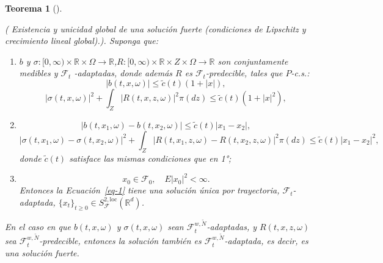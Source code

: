 \documentclass[
  spanish,
  us-letterpaper,
]{scrreprt}
\theoremstyle{plain}
\newtheorem{theorem}{Teorema}[chapter]
\theoremstyle{plain}
\theoremstyle{definition}
\theoremstyle{remark}
\begin{document}
\begin{theorem}[]\protect\hypertarget{thm-exis_uni_glo_fuerte_SDE}{}\label{thm-exis_uni_glo_fuerte_SDE}

( Existencia y unicidad global de una solución fuerte (condiciones de
Lipschitz y crecimiento lineal global).). Suponga que:

\begin{enumerate}
\def\labelenumi{\arabic{enumi}.}
\item
  \(b\) y
  \(\sigma : [0,\infty) \times \mathbb{R} \times \Omega \to \mathbb{R}\),\(R : [0,\infty) \times \mathbb{R}\times Z \times \Omega \to \mathbb{R}\)
  son conjuntamente medibles y \(\mathcal{F}_t\) -adaptadas, donde
  además \(R\) es \(\mathcal{F}_t\)-predecible, tales que \(P\)-c.s.:
  \[|b(t,x,\omega)| \leq \widetilde{c} (t)(1 + |x|),\]
  \[|\sigma(t,x,\omega)|^2 + \int_Z |R(t,x,z,\omega)|^2 \pi(dz) \leq \widetilde{c}(t)(1 + |x|^2),\]
\item
  \[|b(t,x_1,\omega) - b(t,x_2,\omega)| \leq \widetilde{c}(t) |x_1 - x_2|,\]
  \[|\sigma(t,x_1,\omega) - \sigma(t,x_2,\omega)|^2 + \int_Z |R(t,x_1,z,\omega) - R(t,x_2,z,\omega)|^2 \pi(dz) \leq \widetilde{c}(t) |x_1 - x_2|^2,\]
  donde \(\widetilde{c}(t)\) satisface las mismas condiciones que en 1°;
\item
  \[x_0 \in \mathcal{F}_0, \quad E|x_0|^2 < \infty.\] Entonces la
  Ecuación~\ref{eq-1} tiene una solución única por trayectoria,
  \(\mathcal{F}_t\)-adaptada,
  \(\{x_t\}_{t \geq 0} \in S_{\mathcal{F}}^{2,\text{loc}}(\mathbb{R}^d)\).
\end{enumerate}

En el caso en que \(b(t,x,\omega)\) y \(\sigma(t,x,\omega)\) sean
\(\mathcal{F}_t^{w,\tilde{N}}\)-adaptadas, y \(R(t,x,z,\omega)\) sea
\(\mathcal{F}_t^{w,\tilde{N}}\)-predecible, entonces la solución también
es \(\mathcal{F}_t^{w,\tilde{N}}\)-adaptada, es decir, es una solución
fuerte.

\end{theorem}
\end{document}
